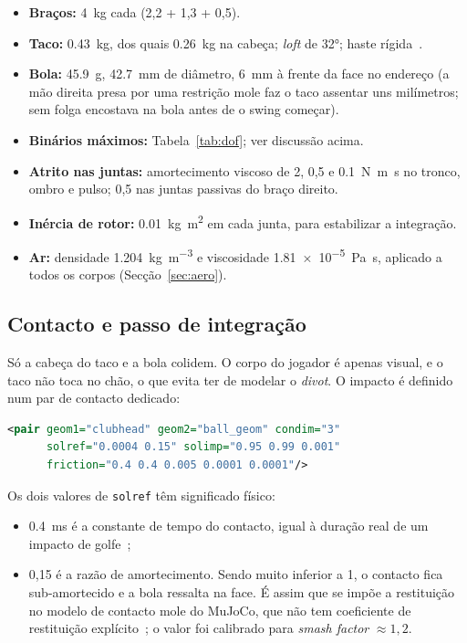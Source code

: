 \documentclass[11pt,a4paper]{article}
\begin{document}
\begin{itemize}
  \item \textbf{Braços:} \SI{4}{\kilo\gram} cada (2,2 + 1,3 + 0,5).
  \item \textbf{Taco:} \SI{0.43}{\kilo\gram}, dos quais \SI{0.26}{\kilo\gram}
        na cabeça; \emph{loft} de \ang{32}; haste rígida~\cite{milne1992}.
  \item \textbf{Bola:} \SI{45.9}{\gram}, \SI{42.7}{\milli\meter} de diâmetro,
        \SI{6}{\milli\meter} à frente da face no endereço (a mão direita presa
        por uma restrição mole faz o taco assentar uns milímetros; sem folga
        encostava na bola antes de o swing começar).
  \item \textbf{Binários máximos:} Tabela~\ref{tab:dof}; ver discussão acima.
  \item \textbf{Atrito nas juntas:} amortecimento viscoso de 2, 0{,}5 e
        \SI{0.1}{\newton\meter\second} no tronco, ombro e pulso; 0{,}5 nas
        juntas passivas do braço direito.
  \item \textbf{Inércia de rotor:} \SI{0.01}{\kilo\gram\meter\squared} em cada
        junta, para estabilizar a integração.
  \item \textbf{Ar:} densidade \SI{1.204}{\kilo\gram\per\meter\cubed} e
        viscosidade \SI{1.81e-5}{\pascal\second}, aplicado a todos os corpos
        (Secção~\ref{sec:aero}).
\end{itemize}

\subsection{Contacto e passo de integração}
\label{sec:contacto}

Só a cabeça do taco e a bola colidem. O corpo do jogador é apenas visual, e o
taco não toca no chão, o que evita ter de modelar o \emph{divot}. O impacto é
definido num par de contacto dedicado:

\begin{lstlisting}[language=XML]
<pair geom1="clubhead" geom2="ball_geom" condim="3"
      solref="0.0004 0.15" solimp="0.95 0.99 0.001"
      friction="0.4 0.4 0.005 0.0001 0.0001"/>
\end{lstlisting}

Os dois valores de \texttt{solref} têm significado físico:
\begin{itemize}
  \item \SI{0.4}{\milli\second} é a constante de tempo do contacto, igual à
        duração real de um impacto de golfe~\cite{penner2003};
  \item 0,15 é a razão de amortecimento. Sendo muito inferior a 1, o contacto
        fica sub-amortecido e a bola ressalta na face. É assim que se impõe a
        restituição no modelo de contacto mole do MuJoCo, que não tem
        coeficiente de restituição explícito~\cite{todorov2012}; o valor foi
        calibrado para \emph{smash factor} $\approx 1{,}2$.
\end{itemize}
\end{document}

